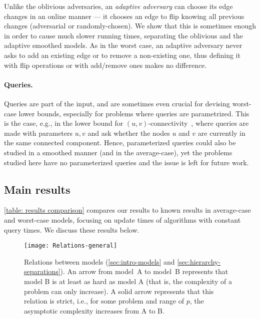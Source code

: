 \documentclass[letter,11pt]{article}
\begin{document}
Unlike the oblivious adversaries, an \emph{adaptive adversary} can choose its edge changes in an online manner --- it chooses an edge to flip knowing all previous changes (adversarial or randomly-chosen).
We show that this is sometimes enough in order to cause much slower running times, separating the oblivious and the adaptive smoothed models.
As in the worst case, an adaptive adversary never asks to add an existing edge or to remove a non-existing one, thus defining it with flip operations or with add/remove ones makes no difference.


\paragraph{Queries.} Queries are part of the input, and are sometimes even crucial for devising worst-case lower bounds, especially for problems where queries are parametrized.
This is the case, e.g., in the lower bound
for $(u,v)$-connectivity~\cite{PatrascuD06},
where queries are made with parameters $u,v$ and ask whether the nodes $u$ and $v$ are currently in the same connected component.
Hence, parameterized queries could also be studied in a smoothed manner (and in the average-case), yet the problems studied here have no parameterized queries and the issue is left for future work.

\subsection{Main results}
\label{sec:intro-results}    
\cref{table: results comparison} compares our results to known results in average-case and worst-case models, focusing on  
update times of algorithms with constant query times.
We discuss these results below.


\begin{figure}
	\centering
	\texttt{[image: Relations-general]}
	\caption{Relations between models (\cref{sec:intro-models} and \cref{sec:hierarchy-separations}).
		An arrow from model~A to model~B represents that model B is at least as hard as model A (that is, the complexity of a problem can only increase).
		A solid arrow represents that this relation is strict, i.e., for some problem and range of $p$, 
		the asymptotic complexity increases from A to B.} 
	\label{fig:relations between models}
\end{figure}
\end{document}
